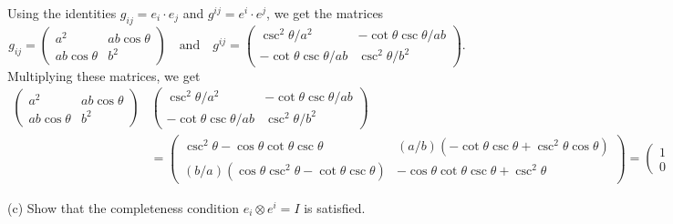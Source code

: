 \documentclass{../../templates/lkx_pset}
\begin{document}
\begin{parts}
	Using the identities $g_{ij} = e_i\cdot e_j$ and $g^{ij} = e^i\cdot e^j$, we get the matrices
	\[
		g_{ij} =
		\begin{pmatrix}a^2 & ab\cos\theta \\ ab\cos\theta & b^2\end{pmatrix}
		\quad\textrm{and}\quad
		g^{ij} =
		\begin{pmatrix} \csc^2\theta / a^2         & -\cot\theta\csc\theta / ab \\
                -\cot\theta\csc\theta / ab & \csc^2\theta / b^2
		\end{pmatrix}.
	\]
	Multiplying these matrices, we get
	\[
		\begin{aligned}
			\begin{pmatrix}a^2 & ab\cos\theta \\ ab\cos\theta & b^2\end{pmatrix}
			 & \begin{pmatrix} \csc^2\theta / a^2         & -\cot\theta\csc\theta / ab \\
                -\cot\theta\csc\theta / ab & \csc^2\theta / b^2
			   \end{pmatrix} \\
			 & =
			\begin{pmatrix}
				\csc^2\theta-\cos\theta\cot\theta\csc\theta        & (a/b)(-\cot\theta\csc\theta + \csc^2\theta\cos\theta) \\
				(b/a)(\cos\theta\csc^2\theta-\cot\theta\csc\theta) & -\cos\theta\cot\theta\csc\theta + \csc^2\theta
			\end{pmatrix}
			= \begin{pmatrix}1&0\\0&1\end{pmatrix}.
		\end{aligned}
	\]

	\begin{part}{(c)}
		Show that the completeness condition $e_i\otimes e^i = I$ is satisfied.
	\end{part}


\end{parts}
\end{document}
